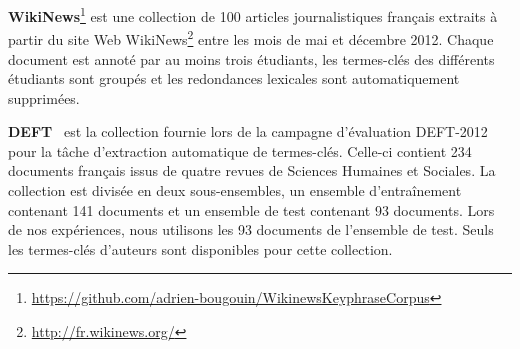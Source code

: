       \textbf{WikiNews}\footnote{\url{https://github.com/adrien-bougouin/WikinewsKeyphraseCorpus}}
      est une collection de 100 articles journalistiques français extraits à
      partir du site Web WikiNews\footnote{\url{http://fr.wikinews.org/}} entre
      les mois de mai et décembre 2012. Chaque document est annoté par au moins
      trois étudiants, les termes-clés des différents étudiants sont groupés et
      les redondances lexicales sont automatiquement supprimées.

      \textbf{DEFT}~\cite{paroubek2012deft} est la collection fournie lors de la
      campagne d'évaluation DEFT-2012 pour la tâche d'extraction automatique de
      termes-clés. Celle-ci contient 234 documents français issus de quatre
      revues de Sciences Humaines et Sociales. La collection est divisée en deux
      sous-ensembles, un ensemble d'entraînement contenant 141 documents et un
      ensemble de test contenant 93 documents. Lors de nos expériences, nous
      utilisons les 93 documents de l'ensemble de test. Seuls les termes-clés
      d'auteurs sont disponibles pour cette collection.

